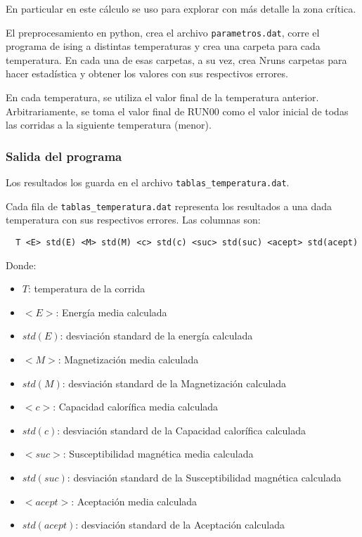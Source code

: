 En particular en este c\'alculo se uso para explorar con m\'as detalle la zona
cr\'itica.

El preprocesamiento en python, crea el archivo \texttt{parametros.dat}, 
 corre el programa de ising a distintas temperaturas y crea una carpeta para 
 cada temperatura. En cada una de esas carpetas, a su vez, crea Nruns carpetas 
 para hacer estadística y obtener los valores con sus respectivos errores.
 
  En cada temperatura, se utiliza el valor final de la temperatura anterior.
  Arbitrariamente, se toma el valor final de RUN00 como el valor inicial de
  todas las corridas a la siguiente temperatura (menor).
 

\subsubsection{Salida del programa}

Los resultados los guarda en el archivo \texttt{tablas\_temperatura.dat}.

Cada fila de \texttt{tablas\_temperatura.dat} representa los resultados a una 
dada temperatura con sus respectivos errores. Las columnas son:

\begin{verbatim}
  T <E> std(E) <M> std(M) <c> std(c) <suc> std(suc) <acept> std(acept)
\end{verbatim}

Donde:



\begin{itemize}
  \item $T$: temperatura de la corrida 
    \item $<E>$: Energ\'ia media calculada
    \item  $std(E)$: desviaci\'on standard de la energ\'ia calculada

    \item $<M>$: Magnetizaci\'on media calculada
    \item  $std(M)$: desviaci\'on standard de la Magnetizaci\'on calculada


    \item $<c>$: Capacidad calor\'ifica media calculada
    \item  $std(c)$: desviaci\'on standard de la Capacidad calor\'ifica calculada

    \item $<suc>$: Susceptibilidad magn\'etica media calculada
    \item  $std(suc)$: desviaci\'on standard de la Susceptibilidad magn\'etica calculada


    \item $<acept>$: Aceptaci\'on media calculada
    \item  $std(acept)$: desviaci\'on standard de la Aceptaci\'on calculada
\end{itemize}


